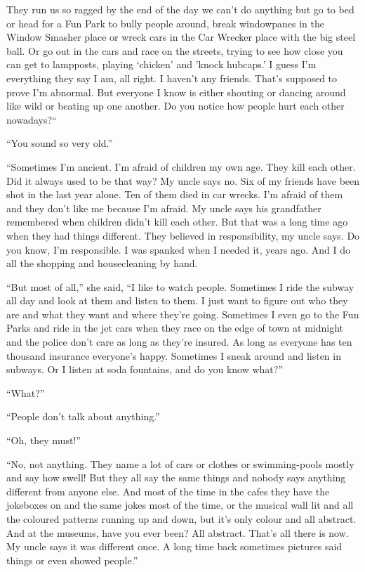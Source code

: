 \documentclass[11pt,openany]{book}
\begin{document}
They run us so ragged by the end of the day we can't do anything but go to bed or head for a Fun Park to bully people around, break windowpanes in the Window Smasher place or wreck cars in the Car Wrecker place with the big steel ball. Or go out in the cars and race on the streets, trying to see how close you can get to lampposts, playing `chicken' and 'knock hubcaps.' I guess I'm everything they say I am, all right. I haven't any friends. That's supposed to prove I'm abnormal. But everyone I know is either shouting or dancing around like wild or beating up one another. Do you notice how people hurt each other nowadays?``

``You sound so very old.''

``Sometimes I'm ancient. I'm afraid of children my own age. They kill each other. Did it always used to be that way? My uncle says no. Six of my friends have been shot in the last year alone. Ten of them died in car wrecks. I'm afraid of them and they don't like me because I'm afraid. My uncle says his grandfather remembered when children didn't kill each other. But that was a long time ago when they had things different. They believed in responsibility, my uncle says. Do you know, I'm responsible. I was spanked when I needed it, years ago. And I do all the shopping and housecleaning by hand.

``But most of all,'' she said, ``I like to watch people. Sometimes I ride the subway all day and look at them and listen to them. I just want to figure out who they are and what they want and where they're going. Sometimes I even go to the Fun Parks and ride in the jet cars when they race on the edge of town at midnight and the police don't care as long as they're insured. As long as everyone has ten thousand insurance everyone's happy. Sometimes I sneak around and listen in subways. Or I listen at soda fountains, and do you know what?''

``What?''

``People don't talk about anything.''

``Oh, they must!''

``No, not anything. They name a lot of cars or clothes or swimming-pools mostly and say how swell! But they all say the same things and nobody says anything different from anyone else. And most of the time in the cafes they have the jokeboxes on and the same jokes most of the time, or the musical wall lit and all the coloured patterns running up and down, but it's only colour and all abstract. And at the museums, have you ever been? All abstract. That's all there is now. My uncle says it was different once. A long time back sometimes pictures said things or even showed people.''
\end{document}
